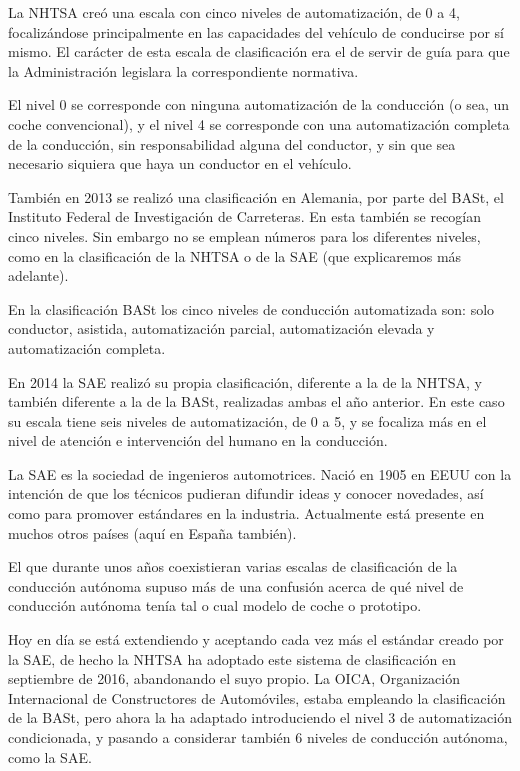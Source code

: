 \documentclass{pclass}
\begin{document}
La NHTSA creó una escala con cinco niveles de automatización, de 0 a 4, focalizándose principalmente en las capacidades del vehículo de conducirse por sí mismo. El carácter de esta escala de clasificación era el de servir de guía para que la Administración legislara la correspondiente normativa.

El nivel 0 se corresponde con ninguna automatización de la conducción (o sea, un coche convencional), y el nivel 4 se corresponde con una automatización completa de la conducción, sin responsabilidad alguna del conductor, y sin que sea necesario siquiera que haya un conductor en el vehículo.

También en 2013 se realizó una clasificación en Alemania, por parte del BASt, el Instituto Federal de Investigación de Carreteras. En esta también se recogían cinco niveles. Sin embargo no se emplean números para los diferentes niveles, como en la clasificación de la NHTSA o de la SAE (que explicaremos más adelante).

En la clasificación BASt los cinco niveles de conducción automatizada son: solo conductor, asistida, automatización parcial, automatización elevada y automatización completa.

En 2014 la SAE realizó su propia clasificación, diferente a la de la NHTSA, y también diferente a la de la BASt, realizadas ambas el año anterior. En este caso su escala tiene seis niveles de automatización, de 0 a 5, y se focaliza más en el nivel de atención e intervención del humano en la conducción.

La SAE es la sociedad de ingenieros automotrices. Nació en 1905 en EEUU con la intención de que los técnicos pudieran difundir ideas y conocer novedades, así como para promover estándares en la industria. Actualmente está presente en muchos otros países (aquí en España también).

El que durante unos años coexistieran varias escalas de clasificación de la conducción autónoma supuso más de una confusión acerca de qué nivel de conducción autónoma tenía tal o cual modelo de coche o prototipo.

Hoy en día se está extendiendo y aceptando cada vez más el estándar creado por la SAE, de hecho la NHTSA ha adoptado este sistema de clasificación en septiembre de 2016, abandonando el suyo propio. La OICA, Organización Internacional de Constructores de Automóviles, estaba empleando la clasificación de la BASt, pero ahora la ha adaptado introduciendo el nivel 3 de automatización condicionada, y pasando a considerar también 6 niveles de conducción autónoma, como la SAE.
\end{document}
